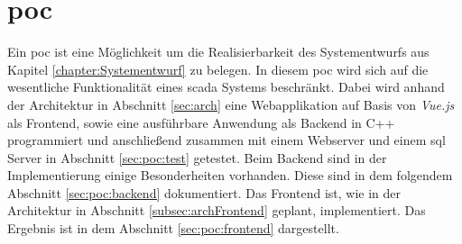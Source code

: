 \chapter{\acl{poc}}\label{chapter:poc}
Ein \ac{poc} ist eine Möglichkeit um die Realisierbarkeit des Systementwurfs aus Kapitel \ref{chapter:Systementwurf} zu belegen.
In diesem  \ac{poc} wird sich auf die wesentliche Funktionalität eines \ac{scada} Systems beschränkt.
Dabei wird anhand der Architektur in Abschnitt \ref{sec:arch} eine Webapplikation auf Basis von \emph{Vue.js} als Frontend, 
sowie eine ausführbare Anwendung als Backend in C++ programmiert und anschließend zusammen mit einem Webserver und einem \ac{sql} Server in Abschnitt \ref{sec:poc:test} getestet.
Beim Backend sind in der Implementierung einige Besonderheiten vorhanden.
Diese sind in dem folgendem Abschnitt \ref{sec:poc:backend} dokumentiert.
Das Frontend ist, wie in der Architektur in Abschnitt \ref{subsec:archFrontend} geplant, implementiert.
Das Ergebnis ist in dem Abschnitt \ref{sec:poc:frontend} dargestellt.


